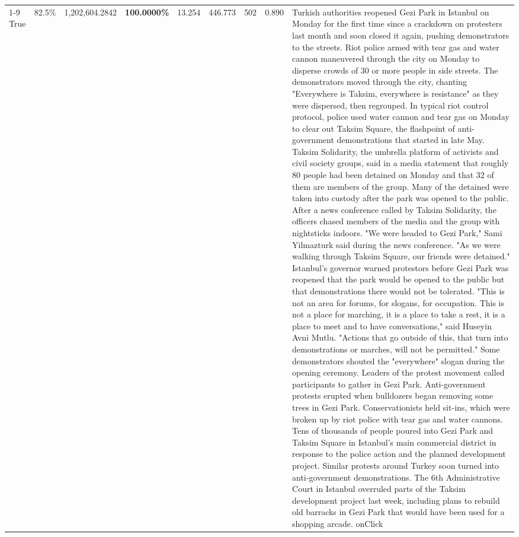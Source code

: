 \begin{table}[H]
\begin{tabular}{lllrlllll}
\cline{1-9}
True & 82.5\% & 1,202,604.2842 & \bfseries \color{red} 100.0000\% & 13.254 & 446.773 & 502 & 0.890 & Turkish authorities reopened Gezi Park in Istanbul on Monday for the first time since a crackdown on protesters last month and soon closed it again, pushing demonstrators to the streets. Riot police armed with tear gas and water cannon maneuvered through the city on Monday to disperse crowds of 30 or more people in side streets. The demonstrators moved through the city, chanting "Everywhere is Taksim, everywhere is resistance" as they were dispersed, then regrouped. In typical riot control protocol, police used water cannon and tear gas on Monday to clear out Taksim Square, the flashpoint of anti-government demonstrations that started in late May. Taksim Solidarity, the umbrella platform of activists and civil society groups, said in a media statement that roughly 80 people had been detained on Monday and that 32 of them are members of the group. Many of the detained were taken into custody after the park was opened to the public. After a news conference called by Taksim Solidarity, the officers chased members of the media and the group with nightsticks indoors. "We were headed to Gezi Park," Sami Yilmazturk said during the news conference. "As we were walking through Taksim Square, our friends were detained." Istanbul's governor warned protestors before Gezi Park was reopened that the park would be opened to the public but that demonstrations there would not be tolerated. "This is not an area for forums, for slogans, for occupation. This is not a place for marching, it is a place to take a rest, it is a place to meet and to have conversations," said Huseyin Avni Mutlu. "Actions that go outside of this, that turn into demonstrations or marches, will not be permitted." Some demonstrators shouted the "everywhere" slogan during the opening ceremony. Leaders of the protest movement called participants to gather in Gezi Park. Anti-government protests erupted when bulldozers began removing some trees in Gezi Park. Conservationists held sit-ins, which were broken up by riot police with tear gas and water cannons. Tens of thousands of people poured into Gezi Park and Taksim Square in Istanbul's main commercial district in response to the police action and the planned development project. Similar protests around Turkey soon turned into anti-government demonstrations. The 6th Administrative Court in Istanbul overruled parts of the Taksim development project last week, including plans to rebuild old barracks in Gezi Park that would have been used for a shopping arcade. onClick \\

\end{tabular}
\end{table}

